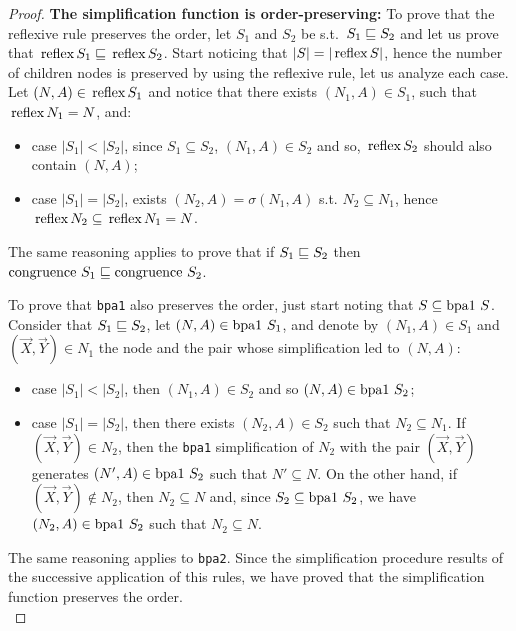 \begin{proof}
	\noindent\textbf{The simplification function is order-preserving:}
	To prove that the reflexive rule preserves the order, let $S_1$ and 
	$S_2$ be s.t.\ $S_1\sqsubseteq S_2$ and let us prove that 
	$\text{\lstinline{reflex}} S_1\leqSets\text{\lstinline{reflex}}S_2$.
	Start noticing that $|S| = |\text{\lstinline{reflex}} S|$, hence
	the number of children nodes is preserved by using the reflexive
	rule, let us analyze each case. Let $(N,A)\in \text{\lstinline{reflex}} S_1$
	and notice that there exists $(N_1,A)\in S_1$, such that
	$\text{\lstinline{reflex}} N_1 = N $, and:
	\begin{itemize}
		\item case $|S_1| < |S_2|$, since $S_1\subseteq S_2$,
		      $(N_1,A)\in S_2$ and so, $\text{\lstinline{reflex}} S_2$
			  should also contain $(N,A)$;
		\item case $|S_1| = |S_2|$, exists $(N_2,A)=\sigma(N_1,A)$ 
		      s.t. $N_2\subseteq N_1$, hence 
		      $\text{\lstinline{reflex}} N_2 \subseteq
		      \text{\lstinline{reflex}} N_1 = N$.
	\end{itemize}
	
	The same reasoning applies to prove that if $S_1\sqsubseteq S_2$ then 
	$\text{\lstinline{congruence} } S_1\leqSets\text{\lstinline{congruence} }S_2$.
	
	To prove that \lstinline{bpa1} also preserves the order, just start
	noting that 
	$S \subseteq \text{\lstinline{bpa1} }S$. Consider that 
	$S_1\sqsubseteq S_2$, let $(N,A)\in \text{\lstinline{bpa1} }S_1$, 
	and denote by $(N_1,A)\in S_1$ and $(\vec X,\vec Y)\in N_1$  
	the node and the pair whose simplification 
	led to $(N,A)$:
	\begin{itemize}
		\item case $|S_1|<|S_2|$, then $(N_1,A)\in S_2$ and so
		      $(N,A)\in \text{\lstinline{bpa1} }S_2$;
		\item case $|S_1|=|S_2|$, then there exists $(N_2,A)\in S_2$
		      such that $N_2 \subseteq N_1$. If $(\vec X,\vec Y)\in N_2$,
		      then the \lstinline{bpa1} simplification of $N_2$ with
		      the pair $(\vec X,\vec Y)$ generates 
		      $(N',A)\in \text{\lstinline{bpa1} }S_2$ such that 
		      $N'\subseteq N$. On the other hand, if 
		      $(\vec X,\vec Y)\not \in N_2$, then $N_2\subseteq N$ 
		      and, since  $S_2 \subseteq \text{\lstinline{bpa1} }S_2$,
		      we have $(N_2,A)\in \text{\lstinline{bpa1} }S_2$ such that
		      $N_2\subseteq N$.
	\end{itemize}
	
	The same reasoning applies to \lstinline{bpa2}. 
	Since the simplification procedure results of the successive 
	application of this rules, we have proved that the simplification
	function preserves the order.\\
	

\end{proof}
